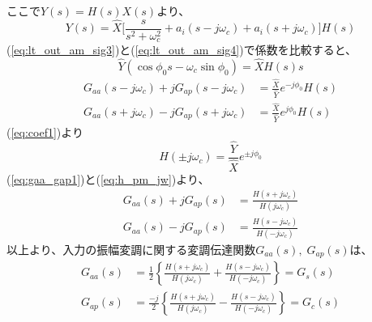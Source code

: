 \documentclass[book]{jlreq}
\begin{document}
%
ここで$Y(s) = H(s) X(s)$より、
%
\begin{equation}
    Y(s) = \hat{X}\biggl [\frac{s}{s^2+\omega_c^2} + a_i(s - j\omega_c) + a_i(s+j\omega_c)  \biggr ] H(s)
    \label{eq:lt_out_am_sig4}
\end{equation}
%
(\ref{eq:lt_out_am_sig3})と(\ref{eq:lt_out_am_sig4})で係数を比較すると、
%
\begin{equation}
    \hat{Y}(\cos\phi_0 s - \omega_c\sin\phi_0) = \hat{X}H(s) s
    \label{eq:coef1}
\end{equation}
%
\begin{equation}
    \begin{split}
        G_{aa}(s-j\omega_c) + j G_{ap}(s-j\omega_c) &= \frac{\hat{X}}{\hat{Y}}e^{-j\phi_0}H(s) \\
        G_{aa}(s+j\omega_c) - j G_{ap}(s+j\omega_c) &= \frac{\hat{X}}{\hat{Y}}e^{j\phi_0}H(s)
    \end{split}
    \label{eq:gaa_gap1}
\end{equation}
%
(\ref{eq:coef1})より
%
\begin{equation}
    H(\pm j\omega_c) = \frac{\hat{Y}}{\hat{X}} e^{\pm j\phi_0}
    \label{eq:h_pm_jw}
\end{equation}
%
(\ref{eq:gaa_gap1})と(\ref{eq:h_pm_jw})より、
%
\begin{equation}
    \begin{split}
        G_{aa}(s) + j G_{ap}(s) &= \frac{H(s+j\omega_c)}{H(j\omega_c)} \\
        G_{aa}(s) - j G_{ap}(s) &= \frac{H(s-j\omega_c)}{H(-j\omega_c)}
    \end{split}
    \label{eq:gaa_gap2}
\end{equation}
%
以上より、入力の振幅変調に関する変調伝達関数$G_{aa}(s),\;G_{ap}(s)$は、
%
\begin{equation}
    \begin{split}
        G_{aa}(s) &= \frac{1}{2}\left\{\frac{H(s+j\omega_c)}{H(j\omega_c)} + \frac{H(s-j\omega_c)}{H(-j\omega_c)}\right\} = G_s(s)\\
        G_{ap}(s) &= \frac{-j}{2}\left\{\frac{H(s+j\omega_c)}{H(j\omega_c)} - \frac{H(s-j\omega_c)}{H(-j\omega_c)}\right\} = G_c(s)
    \end{split}
\end{equation}
\end{document}
